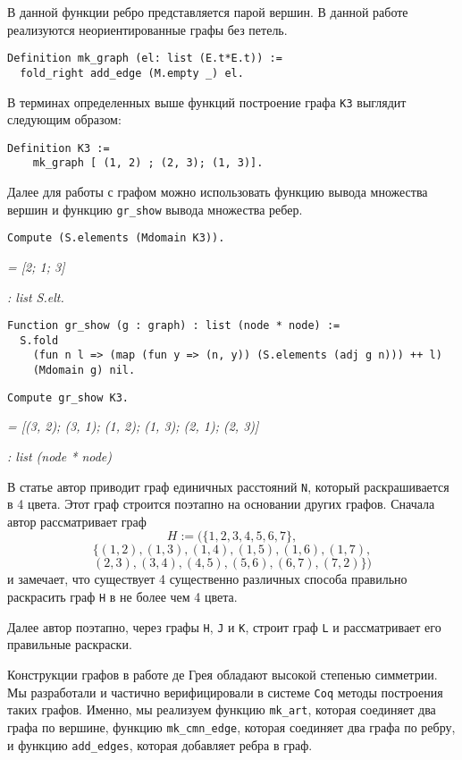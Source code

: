 В данной функции ребро представляется парой вершин.
В данной работе реализуются неориентированные графы без петель.

\begin{verbatim}
Definition mk_graph (el: list (E.t*E.t)) :=
  fold_right add_edge (M.empty _) el.
\end{verbatim}

В терминах определенных выше функций построение графа {\tt K3} выглядит следующим образом:
\begin{verbatim}
Definition K3 := 
    mk_graph [ (1, 2) ; (2, 3); (1, 3)].
\end{verbatim}

Далее для работы с графом можно использовать функцию вывода множества вершин и функцию {\tt gr\_show} вывода множества ребер.
\begin{verbatim}
Compute (S.elements (Mdomain K3)).
\end{verbatim}
{\it = [2; 1; 3]}

{\it    : list S.elt.}

\begin{verbatim}
Function gr_show (g : graph) : list (node * node) :=
  S.fold 
    (fun n l => (map (fun y => (n, y)) (S.elements (adj g n))) ++ l) 
    (Mdomain g) nil.
\end{verbatim}

\begin{verbatim}
Compute gr_show K3.
\end{verbatim}
{\it = [(3, 2); (3, 1); (1, 2); (1, 3); (2, 1); (2, 3)] }

{\it   : list (node * node) }

В статье \cite{deGrey} автор приводит граф единичных расстояний {\tt N}, который раскрашивается в 4 цвета. Этот граф строится поэтапно на основании других графов. Сначала автор рассматривает граф $$H := (\{1, 2, 3, 4, 5, 6, 7 \},$$
    $$ \{(1, 2), (1, 3), (1, 4), (1, 5), (1, 6), (1, 7), $$
    $$ (2, 3), (3, 4), (4, 5), (5, 6), (6, 7), (7, 2)\}) $$ и замечает, что существует 4 существенно различных способа правильно раскрасить граф {\tt H} в не более чем 4 цвета.
    
Далее автор поэтапно, через графы {\tt H}, {\tt J} и {\tt K}, строит граф {\tt L} и рассматривает его правильные раскраски.

Конструкции графов в работе де Грея обладают
высокой степенью симметрии. Мы разработали и частично верифицировали в
системе {\tt Coq} методы построения таких графов. Именно, мы реализуем
функцию {\tt mk\_art}, которая соединяет два графа по вершине, функцию {\tt mk\_cmn\_edge}, которая соединяет два графа по ребру, и функцию {\tt add\_edges}, которая добавляет ребра в граф.


